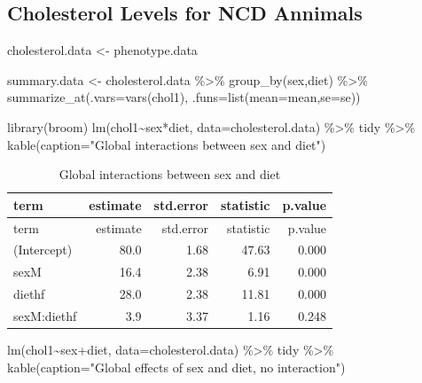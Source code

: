 \documentclass[
]{article}
\newenvironment{Shaded}{\begin{snugshade}}{\end{snugshade}}
\newcommand{\AttributeTok}[1]{\textcolor[rgb]{0.77,0.63,0.00}{#1}}
\newcommand{\FunctionTok}[1]{\textcolor[rgb]{0.00,0.00,0.00}{#1}}
\newcommand{\NormalTok}[1]{#1}
\newcommand{\OtherTok}[1]{\textcolor[rgb]{0.56,0.35,0.01}{#1}}
\newcommand{\SpecialCharTok}[1]{\textcolor[rgb]{0.00,0.00,0.00}{#1}}
\newcommand{\StringTok}[1]{\textcolor[rgb]{0.31,0.60,0.02}{#1}}
\begin{document}
\hypertarget{cholesterol-levels-for-ncd-annimals}{%
\subsection{Cholesterol Levels for NCD
Annimals}\label{cholesterol-levels-for-ncd-annimals}}

\begin{Shaded}
\begin{Highlighting}[]
\NormalTok{cholesterol.data }\OtherTok{\textless{}{-}}
\NormalTok{  phenotype.data }

\NormalTok{summary.data }\OtherTok{\textless{}{-}}
\NormalTok{  cholesterol.data }\SpecialCharTok{\%\textgreater{}\%}
  \FunctionTok{group\_by}\NormalTok{(sex,diet) }\SpecialCharTok{\%\textgreater{}\%}
  \FunctionTok{summarize\_at}\NormalTok{(}\AttributeTok{.vars=}\FunctionTok{vars}\NormalTok{(chol1), }\AttributeTok{.funs=}\FunctionTok{list}\NormalTok{(}\AttributeTok{mean=}\NormalTok{mean,}\AttributeTok{se=}\NormalTok{se))}

\FunctionTok{library}\NormalTok{(broom)}
\FunctionTok{lm}\NormalTok{(chol1}\SpecialCharTok{\textasciitilde{}}\NormalTok{sex}\SpecialCharTok{*}\NormalTok{diet, }\AttributeTok{data=}\NormalTok{cholesterol.data) }\SpecialCharTok{\%\textgreater{}\%}
\NormalTok{  tidy }\SpecialCharTok{\%\textgreater{}\%}
  \FunctionTok{kable}\NormalTok{(}\AttributeTok{caption=}\StringTok{"Global interactions between sex and diet"}\NormalTok{)}
\end{Highlighting}
\end{Shaded}

\begin{longtable}[]{@{}lrrrr@{}}
\caption{Global interactions between sex and diet}\tabularnewline
\toprule()
term & estimate & std.error & statistic & p.value \\
\midrule()
\endfirsthead
\toprule()
term & estimate & std.error & statistic & p.value \\
\midrule()
\endhead
(Intercept) & 80.0 & 1.68 & 47.63 & 0.000 \\
sexM & 16.4 & 2.38 & 6.91 & 0.000 \\
diethf & 28.0 & 2.38 & 11.81 & 0.000 \\
sexM:diethf & 3.9 & 3.37 & 1.16 & 0.248 \\
\bottomrule()
\end{longtable}

\begin{Shaded}
\begin{Highlighting}[]
\FunctionTok{lm}\NormalTok{(chol1}\SpecialCharTok{\textasciitilde{}}\NormalTok{sex}\SpecialCharTok{+}\NormalTok{diet, }\AttributeTok{data=}\NormalTok{cholesterol.data) }\SpecialCharTok{\%\textgreater{}\%}
\NormalTok{  tidy }\SpecialCharTok{\%\textgreater{}\%}
  \FunctionTok{kable}\NormalTok{(}\AttributeTok{caption=}\StringTok{"Global effects of sex and diet, no interaction"}\NormalTok{)}
\end{Highlighting}
\end{Shaded}
\end{document}
